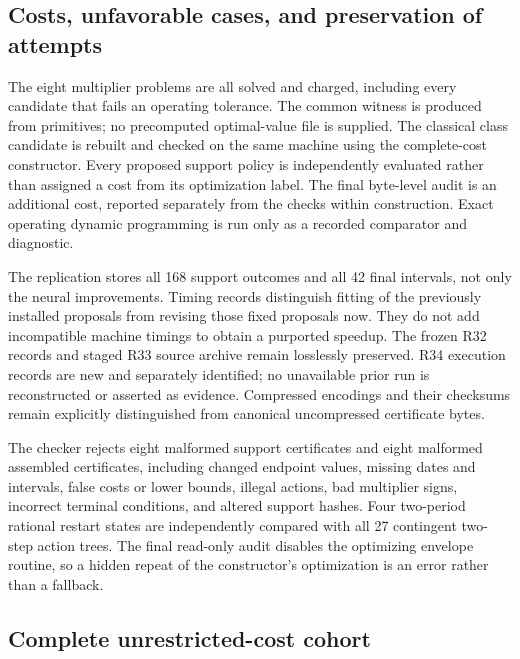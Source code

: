 \subsection{Costs, unfavorable cases, and preservation of attempts}
The eight multiplier problems are all solved and charged, including every candidate that fails an operating tolerance. The common witness is produced from primitives; no precomputed optimal-value file is supplied. The classical class candidate is rebuilt and checked on the same machine using the complete-cost constructor. Every proposed support policy is independently evaluated rather than assigned a cost from its optimization label. The final byte-level audit is an additional cost, reported separately from the checks within construction. Exact operating dynamic programming is run only as a recorded comparator and diagnostic.

The replication stores all 168 support outcomes and all 42 final intervals, not only the neural improvements. Timing records distinguish fitting of the previously installed proposals from revising those fixed proposals now. They do not add incompatible machine timings to obtain a purported speedup. The frozen R32 records and staged R33 source archive remain losslessly preserved. R34 execution records are new and separately identified; no unavailable prior run is reconstructed or asserted as evidence. Compressed encodings and their checksums remain explicitly distinguished from canonical uncompressed certificate bytes.

The checker rejects eight malformed support certificates and eight malformed assembled certificates, including changed endpoint values, missing dates and intervals, false costs or lower bounds, illegal actions, bad multiplier signs, incorrect terminal conditions, and altered support hashes. Four two-period rational restart states are independently compared with all 27 contingent two-step action trees. The final read-only audit disables the optimizing envelope routine, so a hidden repeat of the constructor's optimization is an error rather than a fallback.

\subsection{Complete unrestricted-cost cohort}

